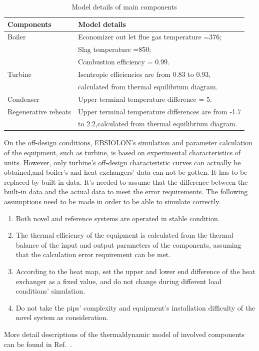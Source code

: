 \documentclass[preprint,12pt]{elsarticle}
\begin{document}
\begin{table}
\caption{Model details of main components}
\label{table:model_details}
\begin{centering}
\begin{tabular}{ll}
\toprule 
Components 				& Model details\tabularnewline
\midrule
Boiler         			& Economizer out let flue gas temperature =376\textcelsius ;\tabularnewline
 						& Slag temperature =850\textcelsius ;\tabularnewline
 						& Combustion efficiency = 0.99.\tabularnewline
Turbine 				& Isentropic efficiencies are from 0.83 to 0.93, \tabularnewline
 						& calculated from thermal equilibrium diagram.\tabularnewline
Condenser 				& Upper terminal temperature difference = 5\textcelsius .\tabularnewline
Regenerative reheats 	& Upper terminal temperature differences are from -1.7\textcelsius{}  \tabularnewline
 						& to 2.2\textcelsius ,calculated from thermal equilibrium diagram.\tabularnewline
\bottomrule
\end{tabular}
\par\end{centering}
\end{table}

On the off-design conditions, EBSIOLON's simulation and parameter calculation of the equipment, such as turbine, is based on experimental characteristics of units.
However, only turbine's off-design characteristic curves can actually be obtained,and boiler's and heat exchangers' data can not be gotten.
It has to be replaced by built-in data.
It’s needed to assume that the difference between the built-in data and the actual data to meet the error requirements.
The following assumptions need to be made in order to be able to simulate correctly.
\begin{enumerate}[(1)]
\item Both novel and reference systems are operated in stable condition.
\item The thermal efficiency of the equipment is calculated from the thermal balance of the input and output parameters of the components, assuming that the calculation error requirement can be met.
\item According to the heat map, set the upper and lower end difference of the heat exchanger as a fixed value, and do not change during different load conditions' simulation.
\item Do not take the pips' complexity and equipment’s installation difficulty of the novel system as consideration.
\end{enumerate}
More detail descriptions of the thermaldynamic model of involved components can be found in Ref.~\cite{Yao2017Multi}.
\end{document}
